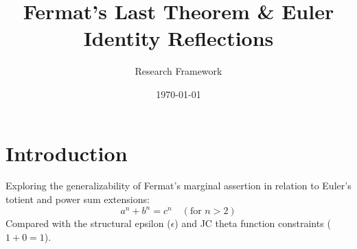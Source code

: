 \documentclass{article}
\title{Fermat's Last Theorem \& Euler Identity Reflections}
\author{Research Framework}
\date{\today}
\begin{document}
\maketitle

\section{Introduction}
Exploring the generalizability of Fermat's marginal assertion in relation to Euler's totient and power sum extensions:
\begin{equation}
a^n + b^n = c^n \quad (\text{for } n > 2)
\end{equation}
Compared with the structural epsilon ($\epsilon$) and JC theta function constraints ($1 + 0 = 1$).
\end{document}
